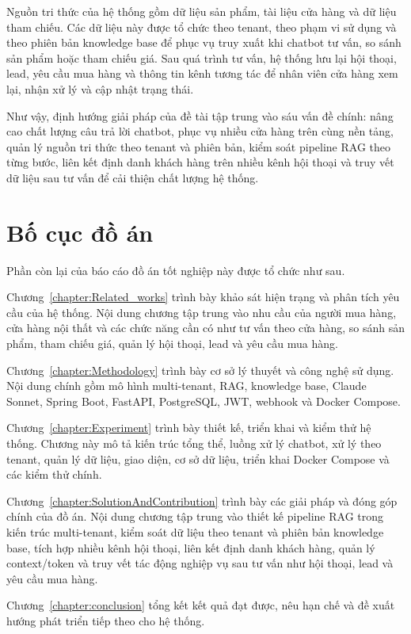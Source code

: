 \documentclass[../DoAn.tex]{subfiles}
\begin{document}
Nguồn tri thức của hệ thống gồm dữ liệu sản phẩm, tài liệu cửa hàng và dữ liệu tham chiếu. Các dữ liệu này được tổ chức theo tenant, theo phạm vi sử dụng và theo phiên bản knowledge base để phục vụ truy xuất khi chatbot tư vấn, so sánh sản phẩm hoặc tham chiếu giá. Sau quá trình tư vấn, hệ thống lưu lại hội thoại, lead, yêu cầu mua hàng và thông tin kênh tương tác để nhân viên cửa hàng xem lại, nhận xử lý và cập nhật trạng thái.

Như vậy, định hướng giải pháp của đề tài tập trung vào sáu vấn đề chính: nâng cao chất lượng câu trả lời chatbot, phục vụ nhiều cửa hàng trên cùng nền tảng, quản lý nguồn tri thức theo tenant và phiên bản, kiểm soát pipeline RAG theo từng bước, liên kết định danh khách hàng trên nhiều kênh hội thoại và truy vết dữ liệu sau tư vấn để cải thiện chất lượng hệ thống.

\section{Bố cục đồ án}
\label{section:1.4}

Phần còn lại của báo cáo đồ án tốt nghiệp này được tổ chức như sau.

Chương~\ref{chapter:Related_works} trình bày khảo sát hiện trạng và phân tích yêu cầu của hệ thống. Nội dung chương tập trung vào nhu cầu của người mua hàng, cửa hàng nội thất và các chức năng cần có như tư vấn theo cửa hàng, so sánh sản phẩm, tham chiếu giá, quản lý hội thoại, lead và yêu cầu mua hàng.

Chương~\ref{chapter:Methodology} trình bày cơ sở lý thuyết và công nghệ sử dụng. Nội dung chính gồm mô hình multi-tenant, RAG, knowledge base, Claude Sonnet, Spring Boot, FastAPI, PostgreSQL, JWT, webhook và Docker Compose.

Chương~\ref{chapter:Experiment} trình bày thiết kế, triển khai và kiểm thử hệ thống. Chương này mô tả kiến trúc tổng thể, luồng xử lý chatbot, xử lý theo tenant, quản lý dữ liệu, giao diện, cơ sở dữ liệu, triển khai Docker Compose và các kiểm thử chính.

Chương~\ref{chapter:SolutionAndContribution} trình bày các giải pháp và đóng góp chính của đồ án. Nội dung chương tập trung vào thiết kế pipeline RAG trong kiến trúc multi-tenant, kiểm soát dữ liệu theo tenant và phiên bản knowledge base, tích hợp nhiều kênh hội thoại, liên kết định danh khách hàng, quản lý context/token và truy vết tác động nghiệp vụ sau tư vấn như hội thoại, lead và yêu cầu mua hàng.

Chương~\ref{chapter:conclusion} tổng kết kết quả đạt được, nêu hạn chế và đề xuất hướng phát triển tiếp theo cho hệ thống.
\end{document}
